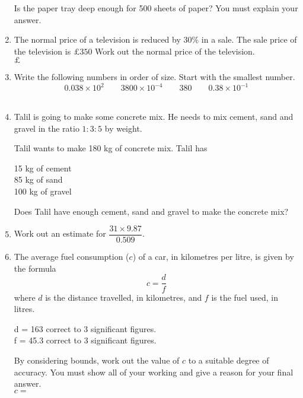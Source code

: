 \begin{enumerate}
    Is the paper tray deep enough for 500 sheets of paper? You must explain your answer.\\[2cm]\vspace*{0pt}
    \item The normal price of a television is reduced by $30\%$ in a sale. The sale price of the television is $\pounds 350$ Work out the normal price of the television.\\[2cm]\vspace*{0pt}\hfill$\pounds$ \dline
    \item Write the following numbers in order of size. Start with the smallest number.
    $$
    0.038 \times 10^2 \qquad 3800 \times 10^{-4} \qquad 380 \qquad 0.38 \times 10^{-1}
    $$\\[2cm]\vspace*{0pt}
    \item Talil is going to make some concrete mix. He needs to mix cement, sand and gravel in the ratio $1 : 3 : 5$ by weight.\par
    Talil wants to make 180 kg of concrete mix. Talil has\par 
    \hspace*{1cm} 15 kg of cement\\
    \hspace*{1cm} 85 kg of sand\\
    \hspace*{1cm} 100 kg of gravel\par
    Does Talil have enough cement, sand and gravel to make the concrete mix?
    \newpage
    \item Work out an estimate for $\dfrac{31\times 9.87}{0.509}$.\\[2cm]\vspace*{0pt}
    \item The average fuel consumption ($c$) of a car, in kilometres per litre, is given by the formula
    $$
    c = \frac{d}{f}
    $$
    where $d$ is the distance travelled, in kilometres, and $f$ is the fuel used, in litres.\par 
    d = 163 correct to 3 significant figures.\\
    f = 45.3 correct to 3 significant figures.\par 
    By considering bounds, work out the value of $c$ to a suitable degree of accuracy. You must show all of your working and give a reason for your final answer.\\[3cm]\vspace*{0pt}\hfill$c=$ \dline

\end{enumerate}
